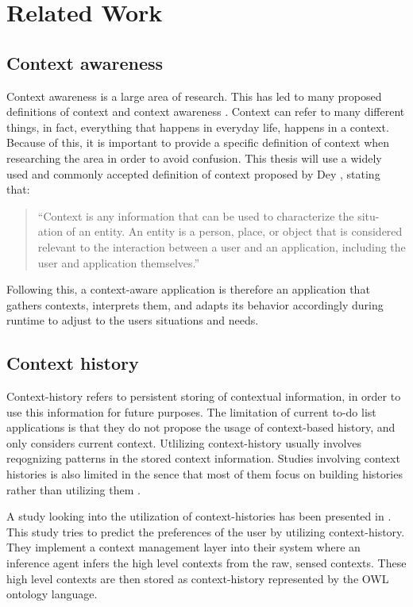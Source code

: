\chapter{Related Work}
\label{chap:relatedwork}

\section{Context awareness}

Context awareness is a large area of research. This has led to many proposed definitions of context and context awareness \cite{liu2011survey}. Context can refer to many different things, in fact, everything that happens in everyday life, happens in a context. Because of this, it is important to provide a specific definition of context when researching the area in order to avoid confusion. This thesis will use a widely used and commonly accepted definition of context proposed by Dey \cite{dey2000providing}, stating that:
\begin{quote}
``Context is any information that can be used to characterize the situ-
ation of an entity. An entity is a person, place, or object that is considered
relevant to the interaction between a user and an application, including the
user and application themselves.''
\end{quote}
Following this, a context-aware application is therefore an application that gathers contexts, interprets them, and adapts its behavior accordingly during runtime to adjust to the users situations and needs.

\section{Context history}

Context-history refers to persistent storing of contextual information, in order to use this information for future purposes. The limitation of current to-do list applications is that they do not propose the usage of context-based history, and only considers current context. Utlilizing context-history usually involves reqognizing patterns in the stored context information. Studies involving context histories is also limited in the sence that most of them focus on building histories rather than utilizing them \cite{chalmers2004historical}.

A study looking into the utilization of context-histories has been presented in \cite{hong2009context}. This study tries to predict the preferences of the user by utilizing context-history. They implement a context management layer into their system where an inference agent infers the high level contexts from the raw, sensed contexts. These high level contexts are then stored as context-history represented by the OWL ontology language.


